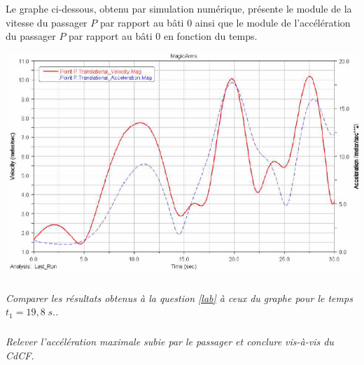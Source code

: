 \documentclass[10pt,oneside]{article}
\begin{document}
Le graphe ci-dessous, obtenu par simulation numérique, présente le module de la vitesse du passager $P$ par rapport au bâti 0 ainsi que le module de l'accélération du passager $P$ par rapport au bâti 0 en fonction du temps. 
\begin{center}
\includegraphics[width=.9\textwidth]{png/img3}
\end{center}

\subparagraph{}
\textit{Comparer les résultats obtenus à la question \ref{lab} à ceux du graphe pour le temps $t_1=19,8\;s.$.}

\subparagraph{}
\textit{Relever l'accélération maximale subie par le passager et conclure vis-à-vis du CdCF.}
\end{document}
